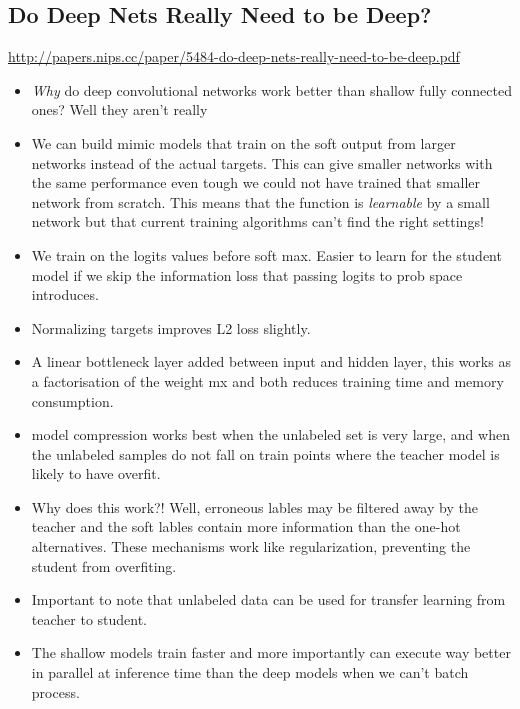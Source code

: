 \documentclass[11pt]{article}
\begin{document}
\subsection{Do Deep Nets Really Need to be Deep?}
\label{sec:orgfdfbdf7}
\url{http://papers.nips.cc/paper/5484-do-deep-nets-really-need-to-be-deep.pdf}

\begin{itemize}
\item \emph{Why} do deep convolutional networks work better than shallow fully connected ones? Well they aren't really
\item We can build mimic models that train on the soft output from larger networks instead of the actual targets. This can give smaller networks with the same performance even tough we could not have trained that smaller network from scratch. This means that the function is \emph{learnable} by a small network but that current training algorithms can't find the right settings!
\item We train on the logits values before soft max. Easier to learn for the student model if we skip the information loss that passing logits to prob space introduces.
\item Normalizing targets improves L2 loss slightly.
\item A linear bottleneck layer added between input and hidden layer, this works as a factorisation of the weight mx and both reduces training time and memory consumption.
\item model compression works best when the unlabeled set is very large, and when the unlabeled samples do not fall on train points where the teacher model is likely to have overfit.
\item Why does this work?! Well, erroneous lables may be filtered away by the teacher and the soft lables contain more information than the one-hot alternatives. These mechanisms work like regularization, preventing the student from overfiting.
\item Important to note that unlabeled data can be used for transfer learning from teacher to student.
\item The shallow models train faster and more importantly can execute way better in parallel at inference time than the deep models when we can't batch process.
\end{itemize}
\end{document}
